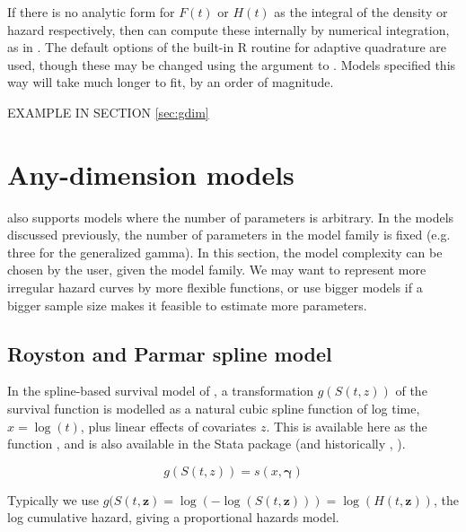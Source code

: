 \documentclass[nojss,nofooter]{jss}
\begin{document}
If there is no analytic form for $F(t)$ or $H(t)$ as the integral of
the density or hazard respectively, then  can compute
these internally by numerical integration, as in 
\citep{stgenreg}.  The default options of the built-in R routine
 for adaptive quadrature are used, though these may be
changed using the  argument to .
Models specified this way will take much longer to fit, by an order of
magnitude.

EXAMPLE IN SECTION \ref{sec:gdim} 




\section{Any-dimension models}

 also supports models where the number of parameters is
arbitrary.  In the models discussed previously, the number of
parameters in the model family is fixed (e.g. three for the
generalized gamma).  In this section, the model complexity can be
chosen by the user, given the model family.  We may want to represent
more irregular hazard curves by more flexible functions, or use bigger
models if a bigger sample size makes it feasible to estimate more
parameters.


\subsection{Royston and Parmar spline model}
\label{sec:spline}

In the spline-based survival model of \citet{royston:parmar}, a
transformation $g(S(t,z))$ of the survival function is modelled as a
natural cubic spline function of log time, $x = \log(t)$, plus linear
effects of covariates $z$.  This is available here as the function
,  and is also available in the Stata package
 \citep{stpm2} (and historically , \citet{stpm:orig,stpm:update}).

  \[g(S(t,z)) = s(x, \bm{\gamma})\]

Typically we use $g(S(t,\mathbf{z}) = \log(-\log(S(t,\mathbf{z}))) =
\log(H(t,\mathbf{z}))$, the log cumulative hazard, giving a
proportional hazards model.    
\end{document}
